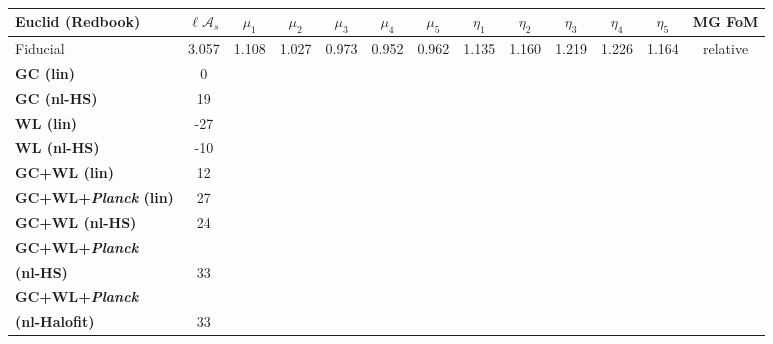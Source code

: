 \begin{table}%
\centering{}%
\small
\begin{tabular}{|l|c|c|c|c|c|c|c|c|c|c|c||c|}
\hline 
\Tstrut \textbf{Euclid} (Redbook)  & $\ell \mathcal{A}_{s}$  & $\mu_{1}$  & $\mu_{2}$  & $\mu_{3}$  & $\mu_{4}$  & $\mu_{5}$  & $\eta_{1}$  
& $\eta_{2}$  & $\eta_{3}$  & $\eta_{4}$ & $\eta_{5}$ & MG FoM
\tabularnewline
\hline 
\Tstrut Fiducial  & 3.057  & 1.108  & 1.027  & 0.973  & 0.952  & 0.962  & 1.135  & 1.160  & 1.219  & 1.226 & 1.164 &  relative\tabularnewline
\hline 
\Tstrut \textbf{GC (lin)}  \Tstrut   & 0 \tabularnewline
\Tstrut \textbf{GC (nl-HS)} \Tstrut  & 19  \tabularnewline
\hline
\hline
\Tstrut \textbf{WL (lin)}    
& -27\tabularnewline
\Tstrut \textbf{WL (nl-HS)}   
& -10  \tabularnewline
\hline
\hline
\Tstrut \textbf{GC+WL (lin)} 
& 12  \tabularnewline
\Tstrut \textbf{GC+WL+{\it Planck} (lin)} 
& 27 \tabularnewline
\hline
\hline
\Tstrut \textbf{GC+WL (nl-HS)} 
& 24 \tabularnewline
\Tstrut \textbf{GC+WL+{\it Planck}} &  &   &  &   &  &   &   &  &   &  & & 
\tabularnewline \textbf{(nl-HS)}  
 
& 33 \tabularnewline
\Tstrut \textbf{GC+WL+{\it Planck}} &  &   &  &   &  &   &   &  &   &  & & 
\tabularnewline \textbf{(nl-Halofit)}  
 
& 33 \tabularnewline
\hline
\end{tabular}
\small
\protect\caption[1$\sigma$ marginalized errors for a Euclid GC and WL survey in a redshift binned scenario of MG.]{\label{tab:errors-all-MGBin3}
}
\end{table}
